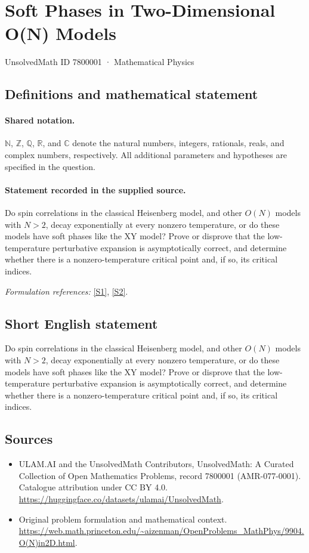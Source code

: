 \documentclass[11pt]{article}
\newcommand{\sref}[2]{\hyperlink{source:#1:#2}{[S#2]}}
\begin{document}
\setcounter{section}{7800000}
\section{Soft Phases in Two-Dimensional O(N) Models}\label{7800001}
{\small UnsolvedMath ID 7800001 · Mathematical Physics}
\subsection{Definitions and mathematical statement}

\paragraph{Shared notation.}$\mathbb N$, $\mathbb Z$, $\mathbb Q$, $\mathbb R$, and $\mathbb C$ denote the natural numbers, integers, rationals, reals, and complex numbers, respectively. All additional parameters and hypotheses are specified in the question.


\paragraph{Statement recorded in the supplied source.}
Do spin correlations in the classical Heisenberg model, and other $O(N)$ models with $N>2$, decay exponentially at every nonzero temperature, or do these models have soft phases like the XY model? Prove or disprove that the low-temperature perturbative expansion is asymptotically correct, and determine whether there is a nonzero-temperature critical point and, if so, its critical indices.
\par\smallskip\textit{Formulation references:} \sref{7800001}{1}, \sref{7800001}{2}.
\subsection{Short English statement}
Do spin correlations in the classical Heisenberg model, and other $O(N)$ models with $N>2$, decay exponentially at every nonzero temperature, or do these models have soft phases like the XY model? Prove or disprove that the low-temperature perturbative expansion is asymptotically correct, and determine whether there is a nonzero-temperature critical point and, if so, its critical indices.
\subsection{Sources}
\begin{itemize}
\item[\hypertarget{source:7800001:1}{S1}] ULAM.AI and the UnsolvedMath Contributors, UnsolvedMath: A Curated Collection of Open Mathematics Problems, record 7800001 (AMR-077-0001). Catalogue attribution under CC BY 4.0.
\url{https://huggingface.co/datasets/ulamai/UnsolvedMath}.
\item[\hypertarget{source:7800001:2}{S2}] Original problem formulation and mathematical context.
\url{https://web.math.princeton.edu/~aizenman/OpenProblems_MathPhys/9904.O(N)in2D.html}.
\end{itemize}
\label{end:7800001}
\end{document}
